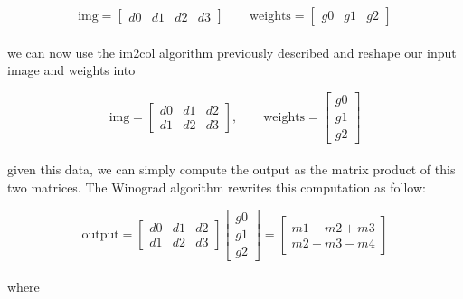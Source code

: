 \documentclass{standalone}
\begin{document}
\begin{equation}
\mbox{img} = \left[\begin{array}{cccc} d0 & d1 & d2 & d3 \end{array}\right] \quad\quad \mbox{weights} = \left[\begin{array}{ccc} g0 & g1 & g2 \end{array}\right]
\end{equation}
\\
we can now use the \textsf{im2col} algorithm previously described and reshape our input image and weights into

\begin{equation}
\mbox{img} = \left[
\begin{array}{ccc}
d0 & d1 & d2 \\
d1 & d2 & d3
\end{array}
\right],
\quad\quad
\mbox{weights} = \left[
\begin{array}{c}
g0 \\
g1 \\
g2
\end{array}
\right]
\end{equation}
\\
given this data, we can simply compute the output as the matrix product of this two matrices.
The Winograd algorithm rewrites this computation as follow:

\begin{equation}
\mbox{output} = \left[
\begin{array}{ccc}
d0 & d1 & d2 \\
d1 & d2 & d3
\end{array}
\right]
\left[
\begin{array}{c}
g0 \\
g1 \\
g2
\end{array}
\right] = \left[
\begin{array}{c}
m1 + m2 + m3 \\
m2 - m3 - m4
\end{array}
\right]
\end{equation}
\\
where
\end{document}
